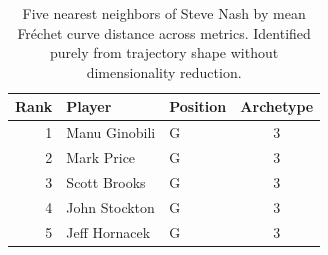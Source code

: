 \begin{table}[htbp]
  \centering\small
  \begin{tabular}{rllc}
    \toprule
    Rank & Player & Position & Archetype \\
    \midrule
    1 & Manu Ginobili & G & 3 \\
    2 & Mark Price & G & 3 \\
    3 & Scott Brooks & G & 3 \\
    4 & John Stockton & G & 3 \\
    5 & Jeff Hornacek & G & 3 \\
    \bottomrule
  \end{tabular}
  \caption{Five nearest neighbors of Steve Nash by mean Fr\'{e}chet curve distance across metrics. Identified purely from trajectory shape without dimensionality reduction.}
  \label{tab:Steve_Nash_frechet_curve_neighbors}
\end{table}

